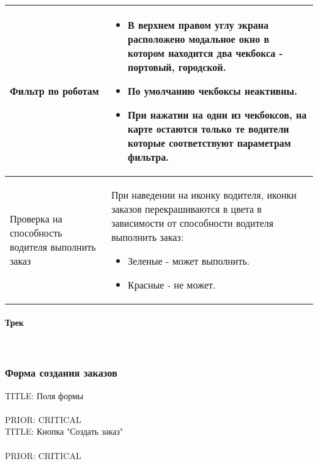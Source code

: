 \begin{longtable}{|p{4cm}|p{9cm}|}
				    \hline	Фильтр по роботам & \begin{itemize} \item В верхнем правом углу экрана расположено модальное окно в котором находится два чекбокса - портовый, городской. \item По умолчанию чекбоксы неактивны. \item При нажатии на одни из чекбоксов, на карте остаются только те водители которые соответствуют параметрам фильтра. \end{itemize}\\ [2mm]

				    \hline	Проверка на способность водителя выполнить заказ & При наведении на иконку водителя, иконки заказов перекрашиваются в цвета в зависимости от способности водителя выполнить заказ:
																				\begin{itemize} 
																					\item Зеленые - может выполнить.
																			   		\item Красные - не может.
																				\end{itemize}\\ [2mm]

					\hline 
				\end{longtable}

			\paragraph{Трек} \label{order_track} \mbox{} \\

				

		\subsubsection{Форма создания заказов}


				TITLE: Поля формы\\
				\\
				PRIOR: CRITICAL\\

				TITLE: Кнопка "Создать заказ"\\
				\\
				PRIOR: CRITICAL\\

